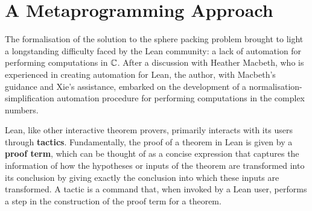 \section{A Metaprogramming Approach}
\label{Ch5:Sec:Meta}

The formalisation of the solution to the sphere packing problem brought to light a longstanding difficulty faced by the Lean community: a lack of automation for performing computations in $\mathbb{C}$. After a discussion with Heather Macbeth, who is experienced in creating automation for Lean, the author, with Macbeth's guidance and Xie's assistance, embarked on the development of a normalisation-simplification automation procedure for performing computations in the complex numbers.


Lean, like other interactive theorem provers, primarily interacts with its users through \textbf{tactics}. Fundamentally, the proof of a theorem in Lean is given by a \textbf{proof term}, which can be thought of as a concise expression that captures the information of how the hypotheses or inputs of the theorem are transformed into its conclusion by giving exactly the conclusion into which these inputs are transformed. A tactic is a command that, when invoked by a Lean user, performs a step in the construction of the proof term for a theorem.

